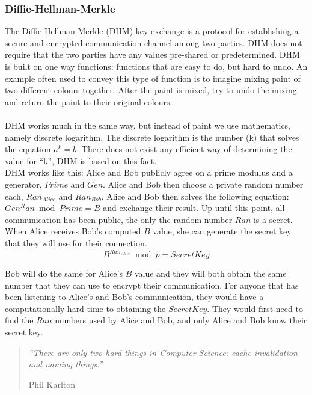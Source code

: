 \subsubsection{Diffie-Hellman-Merkle}
\label{sec:dhm}
The Diffie-Hellman-Merkle (DHM) key exchange \cite{diffie1976new} is a protocol for establishing a secure and encrypted communication channel among two parties. DHM does not require that the two parties have any values pre-shared or predetermined. DHM is built on one way functions: functions that are easy to do, but hard to undo. An example often used to convey this type of function is to imagine mixing paint of two different colours together. After the paint is mixed, try to undo the mixing and return the paint to their original colours.
\\\\
DHM works much in the same way, but instead of paint we use mathematics, namely discrete logarithm. The discrete logarithm is the number (k) that solves the equation $ a^k = b $. There does not exist any efficient way of determining the value for ``k'', DHM is based on this fact.
\\
DHM works like this: Alice and Bob publicly agree on a prime modulus and a generator, $Prime$ and $Gen$. Alice and Bob then choose a private random number each, ${Ran_{Alice}}$ and ${Ran_{Bob}}$. Alice and Bob then solves the following equation: $Gen^Ran \bmod Prime = B$ and exchange their result. Up until this point, all communication has been public, the only the random number $Ran$ is a secret.
\\
When Alice receives Bob's computed $B$ value, she can generate the secret key that they will use for their connection.
$$
  B^{Ran_{Alice}} \bmod p = SecretKey
$$

Bob will do the same for Alice's $B$ value and they will both obtain the same number that they can use to encrypt their communication. For anyone that has been listening to Alice's and Bob's communication,  they would have a computationally hard time to obtaining the $SecretKey$. They would first need to find the $Ran$ numbers used by Alice and Bob, and only Alice and Bob know their secret key.

\begin{quote}
	\textit{``There are only two hard things in Computer Science: cache invalidation and naming things.''}
	\begin{flushright}
		Phil Karlton
	\end{flushright}
\end{quote}

